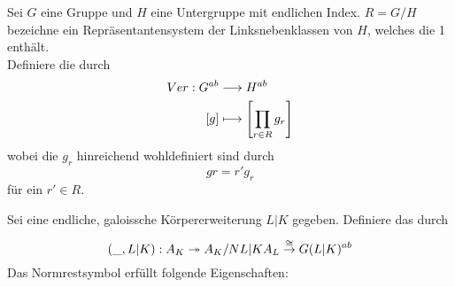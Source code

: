 \documentclass{book}
\begin{document}
Sei $G$ eine Gruppe und $H$ eine Untergruppe mit endlichen Index. $R = G/H$ bezeichne ein Repräsentantensystem der Linksnebenklassen von $H$, welches die 1 enthält.\\ Definiere die  durch
\begin{align*}
Ver : G^{ab}& \overset{}{\longrightarrow} H^{ab}\\
[g] & \longmapsto \left[ \prod_{r \in R}g_r \right]
\end{align*}
wobei die $g_r$ hinreichend wohldefiniert sind durch
\[ gr = r'g_r \]
für ein $r' \in R$.

Sei eine endliche, galoissche Körpererweiterung $L|K$ gegeben. Definiere das  durch
\[ (\_, L|K) : A_K \overset{}{\twoheadrightarrow} A_K/N{L|K}A_L \overset{\overset{}{\cong}}{\rightarrow} G(L|K)^{ab} \]
Das Normrestsymbol erfüllt folgende Eigenschaften:
\end{document}
